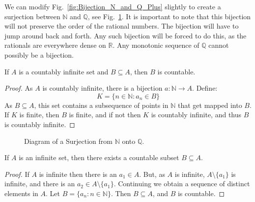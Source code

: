 \documentclass[crop=false,class=book,oneside]{standalone}
\begin{document}
            We can modify Fig.~\ref{fig:Bijection_N_and_Q_Plus}
            slightly to create a surjection between $\mathbb{N}$
            and $\mathbb{Q}$, see
            Fig.~\ref{fig:Bijection_N_and_Q}.
            It is important to note that this bijection will not
            preserve the order of the rational numbers. The
            bijection will have to jump around back and forth.
            Any such bijection will be forced to do this, as the
            rationals are everywhere dense on $\mathbb{R}$. Any
            monotonic sequence of $\mathbb{Q}$ cannot possibly
            be a bijection.
            \begin{theorem}
                If $A$ is a countably infinite set and
                $B\subseteq{A}$, then $B$ is countable.
            \end{theorem}
            \begin{proof}
                As $A$ is countably infinite, there is a bijection
                $a:\mathbb{N}\rightarrow{A}$. Define:
                \begin{equation}
                    K=\{n\in\mathbb{N}:a_{n}\in{B}\}
                \end{equation}
                As $B\subseteq{A}$,
                this set contains a subsequence of points in
                $\mathbb{N}$ that get mapped into $B$. If $K$ is finite,
                then $B$ is finite, and if not then $K$ is countably
                infinite, and thus $B$ is countably infinite.
            \end{proof}
            \begin{figure}[H]
                \centering
                \captionsetup{type=figure}
                \caption{Diagram of a Surjection from
                         $\mathbb{N}$ onto $\mathbb{Q}$.}
                \label{fig:Bijection_N_and_Q}
            \end{figure}
            \begin{theorem}
                If $A$ is an infinite set, then there exists a
                countable subset $B\subseteq{A}$.
            \end{theorem}
            \begin{proof}
                If $A$ is infinite then there is an
                $a_{1}\in{A}$. But, as $A$ is infinite,
                $A\setminus\{a_{1}\}$ is infinite, and there
                is an $a_{2}\in{A}\setminus\{a_{1}\}$. Continuing
                we obtain a sequence of distinct elements in $A$.
                Let $B=\{a_{n}:n\in\mathbb{N}\}$. Then
                $B\subseteq{A}$, and $B$ is countable.
            \end{proof}
\end{document}
